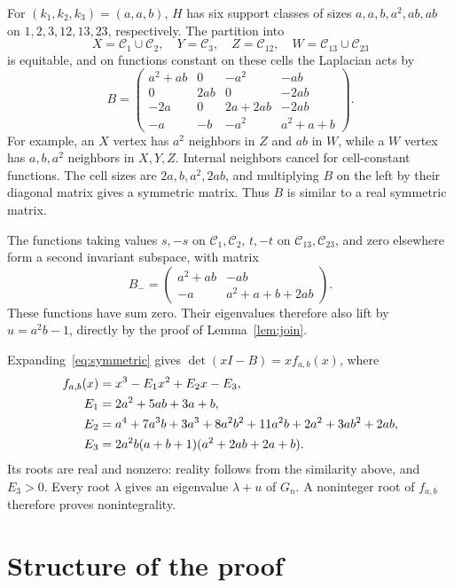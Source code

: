 For $(k_1,k_2,k_3)=(a,a,b)$, $H$ has six support classes of sizes
$a,a,b,a^2,ab,ab$ on $1,2,3,12,13,23$, respectively. The partition into
\[
X=\mathcal C_1\cup\mathcal C_2,\quad Y=\mathcal C_3,\quad
Z=\mathcal C_{12},\quad W=\mathcal C_{13}\cup\mathcal C_{23}
\]
is equitable, and on functions constant on these cells the Laplacian acts by
\begin{equation}
\label{eq:symmetric}
B=\begin{pmatrix}
a^2+ab&0&-a^2&-ab\\
0&2ab&0&-2ab\\
-2a&0&2a+2ab&-2ab\\
-a&-b&-a^2&a^2+a+b
\end{pmatrix}.
\end{equation}
For example, an $X$ vertex has $a^2$ neighbors in $Z$ and $ab$ in $W$,
while a $W$ vertex has $a,b,a^2$ neighbors in $X,Y,Z$.
Internal neighbors cancel for cell-constant functions. The cell sizes are
$2a,b,a^2,2ab$, and multiplying $B$ on the left by their diagonal matrix
gives a symmetric matrix. Thus $B$ is similar to a real symmetric matrix.

The functions taking values $s,-s$ on $\mathcal C_1,\mathcal C_2$,
$t,-t$ on $\mathcal C_{13},\mathcal C_{23}$, and zero elsewhere
form a second invariant subspace, with matrix
\begin{equation}
\label{eq:antisymmetric}
B_-=\begin{pmatrix}a^2+ab&-ab\\-a&a^2+a+b+2ab\end{pmatrix}.
\end{equation}
These functions have sum zero. Their eigenvalues therefore also lift by
$u=a^2b-1$, directly by the proof of Lemma~\ref{lem:join}.

Expanding~\eqref{eq:symmetric} gives $\det(xI-B)=x f_{a,b}(x)$, where
\begin{align}
f_{a,b}(x)&=x^3-E_1x^2+E_2x-E_3,\label{eq:cubic}\\
E_1&=2a^2+5ab+3a+b,\notag\\
E_2&=a^4+7a^3b+3a^3+8a^2b^2+11a^2b+2a^2+3ab^2+2ab,\notag\\
E_3&=2a^2b(a+b+1)(a^2+2ab+2a+b).\notag
\end{align}
Its roots are real and nonzero: reality follows from the similarity above,
and $E_3>0$. Every root $\lambda$ gives an eigenvalue $\lambda+u$ of
$G_n$. A noninteger root of $f_{a,b}$ therefore proves nonintegrality.
\section{Structure of the proof}
\label{sec:proof-structure}

